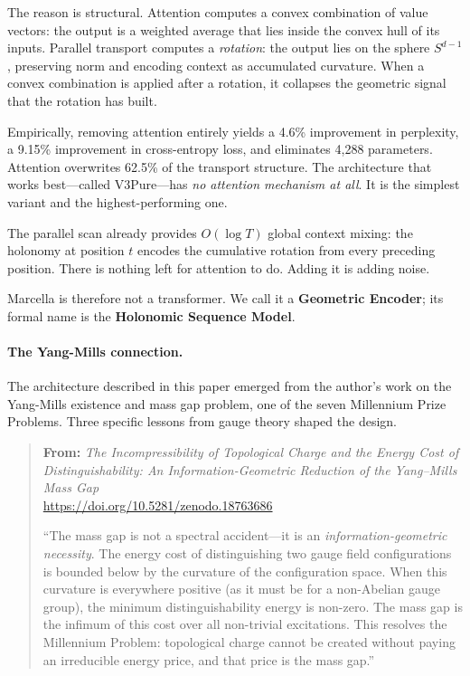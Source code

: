 \documentclass[11pt,a4paper]{article}
\theoremstyle{definition}
\theoremstyle{remark}
\begin{document}
The reason is structural. Attention computes a convex combination of value vectors: the output is a weighted average that lies inside the convex hull of its inputs. Parallel transport computes a \emph{rotation}: the output lies on the sphere $S^{d-1}$, preserving norm and encoding context as accumulated curvature. When a convex combination is applied after a rotation, it collapses the geometric signal that the rotation has built.

Empirically, removing attention entirely yields a 4.6\% improvement in perplexity, a 9.15\% improvement in cross-entropy loss, and eliminates 4,288 parameters. Attention overwrites 62.5\% of the transport structure. The architecture that works best---called V3Pure---has \emph{no attention mechanism at all}. It is the simplest variant and the highest-performing one.

The parallel scan already provides $O(\log T)$ global context mixing: the holonomy at position $t$ encodes the cumulative rotation from every preceding position. There is nothing left for attention to do. Adding it is adding noise.

Marcella is therefore not a transformer. We call it a \textbf{Geometric Encoder}; its formal name is the \textbf{Holonomic Sequence Model}.

\paragraph{The Yang-Mills connection.}
The architecture described in this paper emerged from the author's work on the Yang-Mills existence and mass gap problem, one of the seven Millennium Prize Problems. Three specific lessons from gauge theory shaped the design.

\begin{quote}
\small
\textbf{From:} \emph{The Incompressibility of Topological Charge and the Energy Cost of Distinguishability: An Information-Geometric Reduction of the Yang--Mills Mass Gap} \cite{davis2026yangmills}\\
\url{https://doi.org/10.5281/zenodo.18763686}

\medskip
``The mass gap is not a spectral accident---it is an \emph{information-geometric necessity}. The energy cost of distinguishing two gauge field configurations is bounded below by the curvature of the configuration space. When this curvature is everywhere positive (as it must be for a non-Abelian gauge group), the minimum distinguishability energy is non-zero. The mass gap is the infimum of this cost over all non-trivial excitations. This resolves the Millennium Problem: topological charge cannot be created without paying an irreducible energy price, and that price is the mass gap.''
\end{quote}
\end{document}
